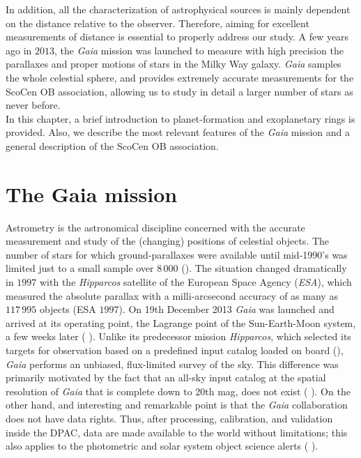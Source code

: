 In addition, all the characterization of astrophysical sources is mainly dependent on the distance relative to the observer. Therefore, aiming for excellent measurements of distance is essential to properly address our study. A few years ago in $2013$, the \textit{Gaia} mission was launched to measure with high precision the parallaxes and proper motions of stars in the Milky Way galaxy. \textit{Gaia} samples the whole celestial sphere, and provides extremely accurate measurements for the ScoCen OB association, allowing us to study in detail a larger number of stars as never before.\\  

In this chapter, a brief introduction to planet-formation and exoplanetary rings is provided. Also, we describe the most relevant features of the \textit{Gaia} mission and a general description of the ScoCen OB association. 
\section{The Gaia mission}\label{sec:Gaiamission}

Astrometry is the astronomical discipline concerned with the accurate measurement and study of the (changing) positions of celestial objects. The number of stars for which ground-parallaxes were available until mid-1990's was limited just to a small sample over $8\,000$  (\citeyear{1995gcts.book.....V}). The situation changed dramatically in $1997$ with the \textit{Hipparcos} satellite of the European Space Agency (\textit{ESA}), which measured the absolute parallax with a milli-arcsecond accuracy of as many as $117\,995$ objects (ESA $1997$). On 19th December 2013 \textit{Gaia} was launched and arrived at its operating point, the Lagrange point of the Sun-Earth-Moon system, a few weeks later ( \citeyear{2016A&A...595A...1G}). Unlike its predecessor mission \textit{Hipparcos}, which selected its targets for observation based on a predefined input catalog loaded on board   (\citeyear{1993BICDS..43....5T}), \textit{Gaia} performs an unbiased, flux-limited survey of the sky. This difference was primarily motivated by the fact that an all-sky input catalog at the spatial resolution of \textit{Gaia} that is complete down to $20$th mag, does not exist ( \citeyear{2016A&A...595A...1G}). On the other hand, and interesting and remarkable point is that the \textit{Gaia} collaboration does not have data rights. Thus, after processing, calibration, and validation inside the DPAC, data are made available to the world without limitations; this also applies to the photometric and solar system object science alerts ( \citeyear{2016A&A...595A...1G}).\\ %


